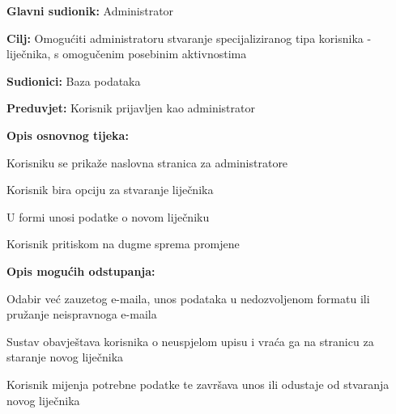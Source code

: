 					\noindent {}
					\begin{packed_item}
	
						\item \textbf{Glavni sudionik: } Administrator
						\item  \textbf{Cilj:} Omogućiti administratoru stvaranje specijaliziranog tipa korisnika - liječnika, s omogučenim posebinim aktivnostima
						\item  \textbf{Sudionici:} Baza podataka
						\item  \textbf{Preduvjet:} Korisnik prijavljen kao administrator
						\item  \textbf{Opis osnovnog tijeka:}
						
						\item[] \begin{packed_enum}
	
							\item Korisniku se prikaže naslovna stranica za administratore
							\item Korisnik bira opciju za stvaranje liječnika
							\item U formi unosi podatke o novom liječniku
							\item Korisnik pritiskom na dugme sprema promjene
							
						\end{packed_enum}
						
						\item  \textbf{Opis mogućih odstupanja:}
						\item[] \begin{packed_item}
						
							\item[2.a] Odabir već zauzetog e-maila, unos podataka u nedozvoljenom formatu ili pružanje neispravnoga e-maila 
							\item[] \begin{packed_enum}
								
								\item Sustav obavještava korisnika o neuspjelom upisu i vraća ga na stranicu za staranje novog liječnika
								\item Korisnik mijenja potrebne podatke te završava unos ili odustaje od stvaranja novog liječnika
								
							\end{packed_enum}
						\end{packed_item}
					\end{packed_item}
					
